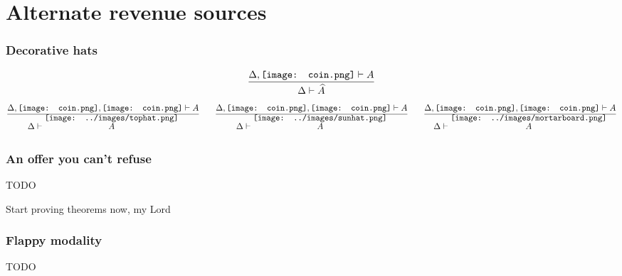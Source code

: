 \documentclass{beamer}
\newcommand{\coin}{\texttt{[image: coin.png]}}
\newcommand{\tophat}[1]{\ensuremath{\overset{\raisebox{-1.4em}[-1em]{\texttt{[image: ../images/tophat.png]}}}{#1}}}
\newcommand{\sunhat}[1]{\ensuremath{\overset{\raisebox{-1.4em}[-1em]{\texttt{[image: ../images/sunhat.png]}}}{#1}}}
\newcommand{\gradhat}[1]{\ensuremath{\overset{\raisebox{-1.4em}[-1em]{\texttt{[image: ../images/mortarboard.png]}}}{#1}}}
\begin{document}
\section{Alternate revenue sources}

\begin{frame}
\frametitle{Decorative hats}
\[\infer
  {\Delta\vdash\widehat{A}}
  {\Delta,\coin\vdash A}
\]
\pause
\[\infer
  {\Delta\vdash\tophat{A}}
  {\Delta,\coin,\coin\vdash A}
\qquad
  \infer
  {\Delta\vdash\sunhat{A}}
  {\Delta,\coin,\coin\vdash A}
\qquad
  \infer
  {\Delta\vdash\gradhat{A}}
  {\Delta,\coin,\coin\vdash A}
\]
\end{frame}

\begin{frame}
\frametitle{An offer you can't refuse}
TODO

Start proving theorems now, my Lord
\end{frame}

\begin{frame}
\frametitle{Flappy modality}
TODO
\end{frame}

\end{document}
